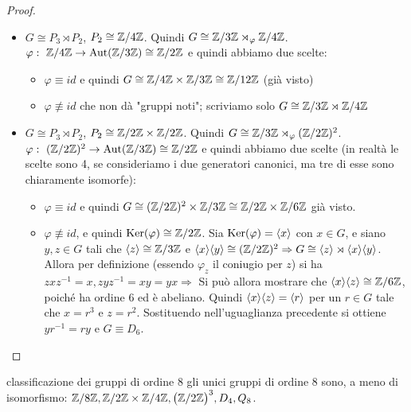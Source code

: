 \begin{proof}
\begin{itemize}
\begin{itemize}
        \end{itemize} 
        \item $G \cong P_3 \rtimes P_2$, $P_2 \cong \mathbb{Z} / 4 \mathbb{Z}$. Quindi $G \cong  \mathbb{Z} / 3 \mathbb{Z} \rtimes_{\varphi} \mathbb{Z} / 4 \mathbb{Z}$. $\varphi : \  \mathbb{Z} / 4 \mathbb{Z} \rightarrow \text{Aut}(\mathbb{Z} / 3 \mathbb{Z}) \cong \mathbb{Z} / 2 \mathbb{Z}$ e quindi abbiamo due scelte:
        \begin{itemize}
            \item $\varphi \equiv id$ e quindi  $G \cong \mathbb{Z} / 4 \mathbb{Z} \times \mathbb{Z} / 3 \mathbb{Z} \cong \mathbb{Z} / 12 \mathbb{Z}$ (già visto)
            \item $\varphi \not\equiv id$ che non dà "gruppi noti"; scriviamo solo $G \cong \mathbb{Z}/3\mathbb{Z}\rtimes \mathbb{Z}/4\mathbb{Z}$
        \end{itemize} 
        \item $G \cong P_3 \rtimes P_2$, $P_2 \cong \mathbb{Z} / 2 \mathbb{Z} \times \mathbb{Z}/2\mathbb{Z}$. Quindi $G \cong \mathbb{Z} / 3 \mathbb{Z}  \rtimes_{\varphi} (\mathbb{Z}/2\mathbb{Z})^2$. $\varphi : \  (\mathbb{Z}/2\mathbb{Z})^2  \rightarrow \text{Aut}(\mathbb{Z} / 3 \mathbb{Z}) \cong \mathbb{Z} / 2 \mathbb{Z}$ e quindi abbiamo due scelte (in realtà le scelte sono 4, se consideriamo i due generatori canonici, ma tre di esse sono chiaramente isomorfe):
        \begin{itemize}
            \item $\varphi \equiv id$ e quindi $G \cong (\mathbb{Z} / 2 \mathbb{Z})^2 \times \mathbb{Z} / 3 \mathbb{Z} \cong  \mathbb{Z} / 2 \mathbb{Z} \times \mathbb{Z} / 6 \mathbb{Z}$ già visto. 
            \item $\varphi \not\equiv id$, e quindi $\text{Ker}(\varphi) \cong \mathbb{Z}/2\mathbb{Z}$. Sia $\text{Ker}(\varphi) = \langle x \rangle$ con $x \in G$, e siano $y,z \in G$ tali che $\langle z \rangle \cong \mathbb{Z}/3\mathbb{Z}$ e $\langle x \rangle\langle y \rangle \cong (\mathbb{Z} / 2 \mathbb{Z})^2 \Rightarrow G \cong \langle z \rangle \rtimes \langle x \rangle\langle y \rangle$. Allora per definizione (essendo $\varphi_z$ il coniugio per $z$) si ha $zxz^{-1} = x, zyz^{-1} = xy = yx \Rightarrow $
        Si può allora mostrare che $\langle x \rangle\langle z \rangle \cong \mathbb{Z}/6\mathbb{Z}$, poiché ha ordine $6$ ed è abeliano. Quindi $\langle x \rangle\langle z \rangle=\langle r \rangle$ per un $r\in G$ tale che $x=r^3 \text{ e }z=r^2$. Sostituendo nell'uguaglianza precedente si ottiene $yr^{-1}=ry$ e $G\equiv D_6$.
        \end{itemize} 
    \end{itemize}
\end{proof}
\begin{example2}{classificazione dei gruppi di ordine 8}
    gli unici gruppi di ordine $8$ sono, a meno di isomorfismo: $\mathbb{Z}/8\mathbb{Z}, \mathbb{Z}/2\mathbb{Z}\times \mathbb{Z}/4\mathbb{Z}, \big(\mathbb{Z}/2\mathbb{Z}\big)^3, D_4,Q_8$.
\end{example2}
